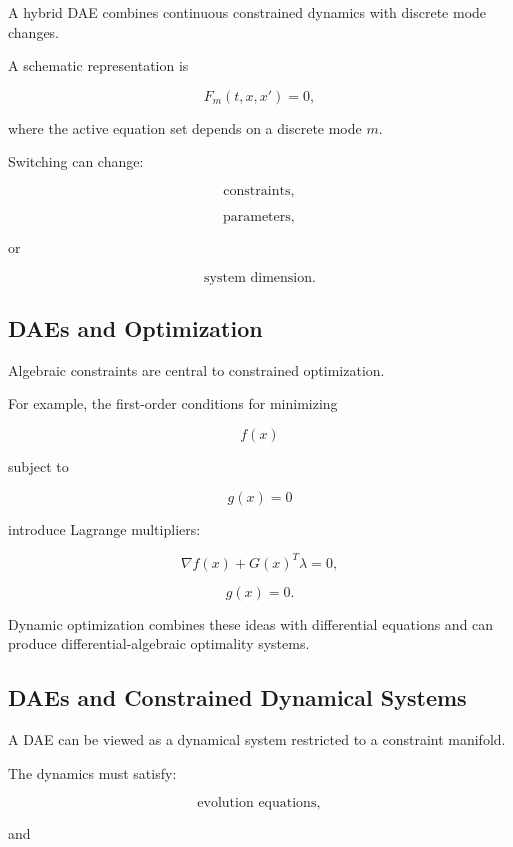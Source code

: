 A hybrid DAE combines continuous constrained dynamics with discrete mode
changes.

A schematic representation is

\[
\boxed{
F_m(t,x,x')=0,
}
\]

where the active equation set depends on a discrete mode \(m\).

Switching can change:

\[
\boxed{
\text{constraints},
}
\]

\[
\boxed{
\text{parameters},
}
\]

or

\[
\boxed{
\text{system dimension}.
}
\]

\subsection{DAEs and Optimization}
\label{subsec:dae-optimization-connection}

Algebraic constraints are central to constrained optimization.

For example, the first-order conditions for minimizing

\[
f(x)
\]

subject to

\[
g(x)=0
\]

introduce Lagrange multipliers:

\[
\boxed{
\nabla f(x)
+
G(x)^T\lambda
=
0,
}
\]

\[
\boxed{
g(x)=0.
}
\]

Dynamic optimization combines these ideas with differential equations and
can produce differential-algebraic optimality systems.

\subsection{DAEs and Constrained Dynamical Systems}
\label{subsec:dae-constrained-dynamical-systems}

A DAE can be viewed as a dynamical system restricted to a constraint
manifold.

The dynamics must satisfy:

\[
\boxed{
\text{evolution equations},
}
\]

and

